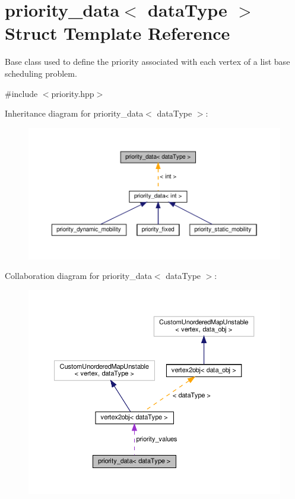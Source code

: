\hypertarget{structpriority__data}{}\section{priority\+\_\+data$<$ data\+Type $>$ Struct Template Reference}
\label{structpriority__data}


Base class used to define the priority associated with each vertex of a list base scheduling problem.  




{\ttfamily \#include $<$priority.\+hpp$>$}



Inheritance diagram for priority\+\_\+data$<$ data\+Type $>$\+:
\nopagebreak
\begin{figure}[H]
\begin{center}
\leavevmode
\includegraphics[width=350pt]{de/d0e/structpriority__data__inherit__graph}
\end{center}
\end{figure}


Collaboration diagram for priority\+\_\+data$<$ data\+Type $>$\+:
\nopagebreak
\begin{figure}[H]
\begin{center}
\leavevmode
\includegraphics[width=350pt]{d4/d16/structpriority__data__coll__graph}
\end{center}
\end{figure}
